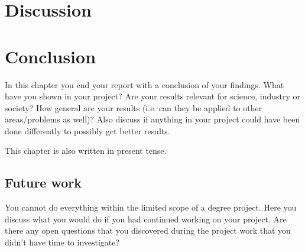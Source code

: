 \documentclass[a4paper,12pt]{article}
\begin{document}
	
	
\newpage
	
\section{Discussion}

\newpage
		
\section{Conclusion}
In this chapter you end your report with a conclusion of your findings. What have you shown in your project? Are your results relevant for science, industry or society? How general are your results (i.e. can they be applied to other areas/problems as well)? Also discuss if anything in your project could have been done differently to possibly get better results. 

This chapter is also written in present tense.

\subsection{Future work}
You cannot do everything within the limited scope of a degree project. Here you discuss what you would do if you had continued working on your project. Are there any open questions that you discovered during the project work that you didn't have time to investigate?

\newpage


%
\newpage

\hypersetup{urlcolor=black}


\newpage
\setcounter{page}{1} %
\appendix

\end{document}
